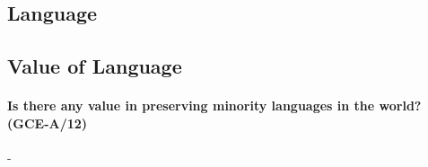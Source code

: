 \documentclass[../../main]{subfiles}
\begin{document}
\subsection{Language}

\subsection{Value of Language}

\paragraph{Is there any value in preserving minority languages in the world? (GCE-A/12)}-
\end{document}
